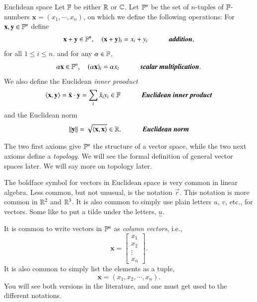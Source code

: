 \begin{myDefinition}{Euclidean space}{} Let $\mathbb{F}$ be either $\mathbb{R}$ or $\mathbb{C}$. Let $ \mathbb{F}^n$ be the set of $n$-tuples of $\mathbb{F}$-numbers $\mathbf{x} = (x_1,\cdots,x_n)$, on which we define the following operations: For $\mathbf{x},\mathbf{y}\in\mathbb{F}^n$ define
\begin{equation}
    \mathbf{x} + \mathbf{y} \in \FF^n, \quad (\mathbf{x}+\mathbf{y})_i = x_i + y_i \text{\axiomname{addition}},
\end{equation}
for all $1 \leq i \leq n$.
and for any $\alpha \in \mathbb{F}$,
\begin{equation}
\alpha \mathbf{x} \in \FF^n, \quad (\alpha \mathbf{x})_i = \alpha x_i \text{\axiomname{scalar multiplication}}.
\end{equation}
We also define the Euclidean \emph{inner prooduct}
\begin{equation}
    \braket{\mathbf{x}, \mathbf{y}} = \bar{\mathbf{x}} \cdot \mathbf{y} = \sum_i \bar{x}_i y_i \in \FF \text{\axiomname{Euclidean inner product}}
\end{equation}
and the Euclidean norm
\begin{equation}
    \|\mathbf{y}\| = \sqrt{\braket{\mathbf{x},
    \mathbf{x}}} \in\RR.\text{\axiomname{Euclidean norm}}
\end{equation}
\end{myDefinition}

The two first axioms give $\mathbb{F}^n$ the structure of a vector space, while the two next axioms define a \emph{topology}. We will see the formal definition of general vector spaces later. We will say more on topology later.

The boldface symbol for vectors in Euclidean space is very common in linear algebra. Less common, but not unusual, is the notation $\vec{r}$. This notation is more common in $\mathbb{R}^2$ and $\mathbb{R}^3$. It is also common to simply use plain letters $u$, $v$, etc., for vectors. Some like to put a tilde under the letters, $\underset{\sim}{u}$.

It is common to write vectors in $\mathbb{F}^n$ as \emph{column vectors}, i.e.,
\begin{equation}
    \mathbf{x} = \begin{bmatrix} x_1 \\ x_2 \\ \vdots \\ x_n \end{bmatrix}.
\end{equation}
It is also common to simply list the elements as a tuple,
\begin{equation}
    \mathbf{x} = (x_1, x_2,\cdots, x_n).
\end{equation}
You will see both versions in the literature, and one must get used to the different notations.


